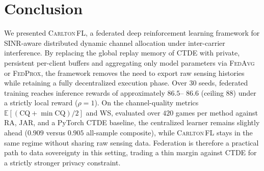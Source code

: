 \documentclass[journal]{IEEEtran}
\newcommand{\OURS}{\textsc{Carlton\,FL}}
\newcommand{\FedAvg}{\textsc{FedAvg}}
\newcommand{\FedProx}{\textsc{FedProx}}
\begin{document}
\section{Conclusion}
\label{sec:conclusion}

We presented \OURS{}, a federated deep reinforcement learning framework for
SINR-aware distributed dynamic channel allocation under inter-carrier
interference. By replacing the global replay memory of CTDE with private,
persistent per-client buffers and aggregating only model parameters via
\FedAvg{} or \FedProx{}, the framework removes the need to export raw sensing
histories while retaining a fully decentralized execution phase. Over $30$
seeds, federated training reaches inference rewards of approximately $86.5$--
$86.6$ (ceiling $88$) under a strictly local reward ($\rho=1$). On the
channel-quality metrics $\mathbb{E}[(\mathrm{CQ}+\min\mathrm{CQ})/2]$ and WS,
evaluated over $420$ games per method against RA, JAR, and a PyTorch CTDE
baseline, the centralized learner remains slightly ahead
($0.909$ versus $0.905$ all-sample composite), while \OURS{} stays in the same
regime without sharing raw sensing data. Federation is therefore a practical
path to data sovereignty in this setting, trading a thin margin against CTDE
for a strictly stronger privacy constraint.
\end{document}
